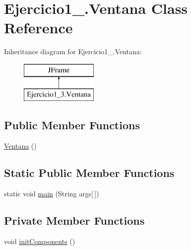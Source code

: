 \hypertarget{class_ejercicio1__3_1_1_ventana}{}\section{Ejercicio1\+\_.\+Ventana Class Reference}
\label{class_ejercicio1__3_1_1_ventana}
Inheritance diagram for Ejercicio1\+\_.\+Ventana\+:\begin{figure}[H]
\begin{center}
\leavevmode
\includegraphics[height=2.000000cm]{class_ejercicio1__3_1_1_ventana}
\end{center}
\end{figure}
\subsection*{Public Member Functions}
\begin{DoxyCompactItemize}
\item 
\mbox{\hyperlink{class_ejercicio1__3_1_1_ventana_a8b3bdda1602e80bf9c916f202d07eeee}{Ventana}} ()
\end{DoxyCompactItemize}
\subsection*{Static Public Member Functions}
\begin{DoxyCompactItemize}
\item 
static void \mbox{\hyperlink{class_ejercicio1__3_1_1_ventana_a4024fcfe8931eb8bbdefd2acb995acd8}{main}} (String args\mbox{[}$\,$\mbox{]})
\end{DoxyCompactItemize}
\subsection*{Private Member Functions}
\begin{DoxyCompactItemize}
\item 
void \mbox{\hyperlink{class_ejercicio1__3_1_1_ventana_abb545e09b5c15696ac2f99ff5456fbc3}{init\+Components}} ()
\end{DoxyCompactItemize}
